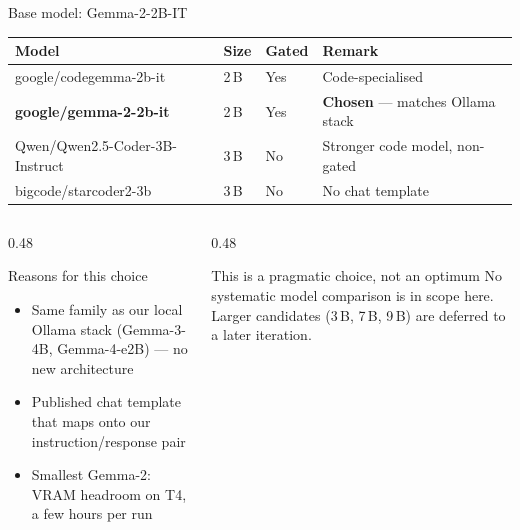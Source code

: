\documentclass[aspectratio=169, 10pt]{beamer}
\begin{document}
\begin{frame}{Base model: Gemma-2-2B-IT}
  \centering\small
  \begin{tabular}{lllp{4.2cm}}
    \toprule
    \textbf{Model} & \textbf{Size} & \textbf{Gated} & \textbf{Remark} \\
    \midrule
    google/codegemma-2b-it           & 2\,B & Yes & Code-specialised \\
    \rowcolor{sfaxlightblue}
    \textbf{google/gemma-2-2b-it}    & 2\,B & Yes & \textbf{Chosen} --- matches Ollama stack \\
    Qwen/Qwen2.5-Coder-3B-Instruct   & 3\,B & No  & Stronger code model, non-gated \\
    bigcode/starcoder2-3b            & 3\,B & No  & No chat template \\
    \bottomrule
  \end{tabular}

  \vspace{0.6em}
  \begin{columns}[T]
    \begin{column}{0.48\textwidth}
      \begin{block}{Reasons for this choice}
        \scriptsize
        \begin{itemize}
          \item Same family as our local Ollama stack
                (Gemma-3-4B, Gemma-4-e2B) --- no new architecture
          \item Published chat template that maps onto our
                instruction/response pair
          \item Smallest Gemma-2: VRAM headroom on T4, a few hours per run
        \end{itemize}
      \end{block}
    \end{column}
    \begin{column}{0.48\textwidth}
      \begin{alertblock}{This is a pragmatic choice, not an optimum}
        \scriptsize
        No systematic model comparison is in scope here.
        Larger candidates (3\,B, 7\,B, 9\,B) are deferred to a
        later iteration.
      \end{alertblock}
    \end{column}
  \end{columns}
\end{frame}
\end{document}
